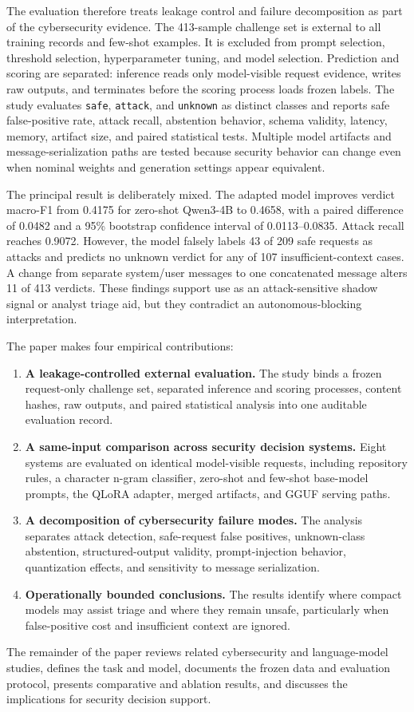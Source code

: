 The evaluation therefore treats leakage control and failure decomposition as part of the cybersecurity evidence. The 413-sample \challenge{} challenge set is external to all training records and few-shot examples. It is excluded from prompt selection, threshold selection, hyperparameter tuning, and model selection. Prediction and scoring are separated: inference reads only model-visible request evidence, writes raw outputs, and terminates before the scoring process loads frozen labels. The study evaluates \texttt{safe}, \texttt{attack}, and \texttt{unknown} as distinct classes and reports safe false-positive rate, attack recall, abstention behavior, schema validity, latency, memory, artifact size, and paired statistical tests. Multiple model artifacts and message-serialization paths are tested because security behavior can change even when nominal weights and generation settings appear equivalent.

The principal result is deliberately mixed. The adapted model improves verdict macro-F1 from 0.4175 for zero-shot Qwen3-4B to 0.4658, with a paired difference of 0.0482 and a 95\% bootstrap confidence interval of 0.0113--0.0835. Attack recall reaches 0.9072. However, the model falsely labels 43 of 209 safe requests as attacks and predicts no unknown verdict for any of 107 insufficient-context cases. A change from separate system/user messages to one concatenated message alters 11 of 413 verdicts. These findings support use as an attack-sensitive shadow signal or analyst triage aid, but they contradict an autonomous-blocking interpretation.

The paper makes four empirical contributions:
\begin{enumerate}
    \item \textbf{A leakage-controlled external evaluation.} The study binds a frozen request-only challenge set, separated inference and scoring processes, content hashes, raw outputs, and paired statistical analysis into one auditable evaluation record.
    \item \textbf{A same-input comparison across security decision systems.} Eight systems are evaluated on identical model-visible requests, including repository rules, a character n-gram classifier, zero-shot and few-shot base-model prompts, the QLoRA adapter, merged artifacts, and GGUF serving paths.
    \item \textbf{A decomposition of cybersecurity failure modes.} The analysis separates attack detection, safe-request false positives, unknown-class abstention, structured-output validity, prompt-injection behavior, quantization effects, and sensitivity to message serialization.
    \item \textbf{Operationally bounded conclusions.} The results identify where compact models may assist triage and where they remain unsafe, particularly when false-positive cost and insufficient context are ignored.
\end{enumerate}

The remainder of the paper reviews related cybersecurity and language-model studies, defines the task and model, documents the frozen data and evaluation protocol, presents comparative and ablation results, and discusses the implications for security decision support.
